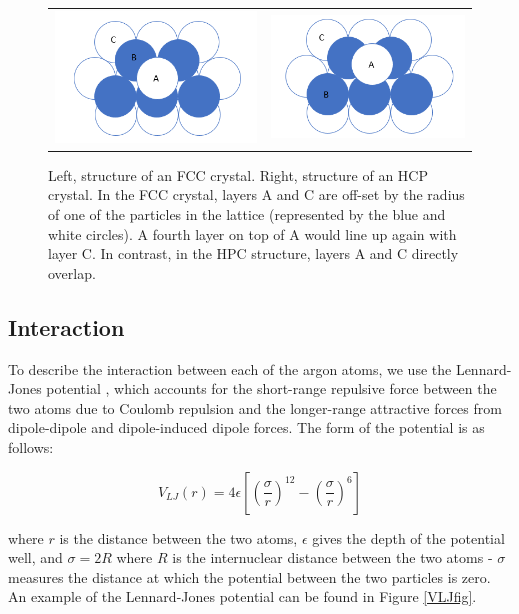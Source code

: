 \documentclass{article}
\begin{document}
\begin{multicols}{2}
\begin{figure}[H]
\begin{center}
\begin{tabular}{ c c }
\includegraphics[width=0.45\linewidth]{plots/fcc_crystal.png} & \includegraphics[width=0.45\linewidth]{plots/hcp_crystal.png}
\end{tabular}
\caption{Left, structure of an FCC crystal.  Right, structure of an HCP crystal.  In the FCC crystal, layers A and C are off-set by the radius of one of the particles in the lattice (represented by the blue and white circles).  A fourth layer on top of A would line up again with layer C.  In contrast, in the HPC structure, layers A and C directly overlap.}
\label{fcc}
\end{center}
\end{figure}

\subsection{Interaction}

To describe the interaction between each of the argon atoms, we use the Lennard-Jones potential \cite{verlet}, which accounts for the short-range repulsive force between the two atoms due to Coulomb repulsion and the longer-range attractive forces from dipole-dipole and dipole-induced dipole forces.  The form of the potential is as follows:

\begin{equation}
V_{LJ}(r) = 4 \epsilon \left [ \left (\frac{\sigma}{r} \right )^{12} - \left (\frac{\sigma}{r} \right )^{6} \right ]
\label{LJpot}
\end{equation}

\noindent where $r$ is the distance between the two atoms, $\epsilon$ gives the depth of the potential well, and $\sigma = 2R $ where $R$ is the internuclear distance between the two atoms - $\sigma$ measures the distance at which the potential between the two particles is zero.  An example of the Lennard-Jones potential can be found in Figure \ref{VLJfig}. \\


\end{multicols}
\end{document}
